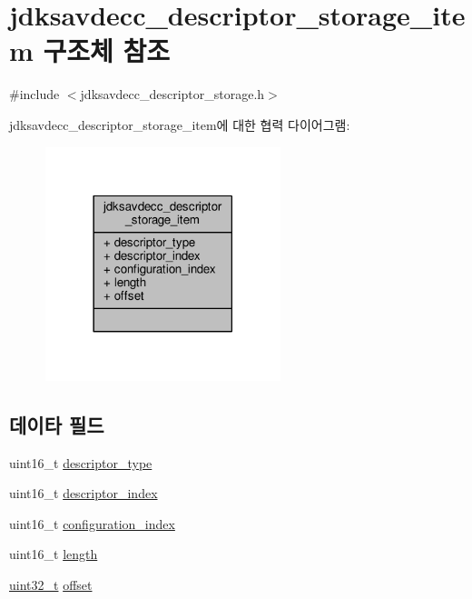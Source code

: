 \hypertarget{structjdksavdecc__descriptor__storage__item}{}\section{jdksavdecc\+\_\+descriptor\+\_\+storage\+\_\+item 구조체 참조}
\label{structjdksavdecc__descriptor__storage__item}


{\ttfamily \#include $<$jdksavdecc\+\_\+descriptor\+\_\+storage.\+h$>$}



jdksavdecc\+\_\+descriptor\+\_\+storage\+\_\+item에 대한 협력 다이어그램\+:
\nopagebreak
\begin{figure}[H]
\begin{center}
\leavevmode
\includegraphics[width=194pt]{structjdksavdecc__descriptor__storage__item__coll__graph}
\end{center}
\end{figure}
\subsection*{데이타 필드}
\begin{DoxyCompactItemize}
\item 
uint16\+\_\+t \hyperlink{structjdksavdecc__descriptor__storage__item_ab7c32b6c7131c13d4ea3b7ee2f09b78d}{descriptor\+\_\+type}
\item 
uint16\+\_\+t \hyperlink{structjdksavdecc__descriptor__storage__item_a042bbc76d835b82d27c1932431ee38d4}{descriptor\+\_\+index}
\item 
uint16\+\_\+t \hyperlink{structjdksavdecc__descriptor__storage__item_afaad1bd7c66f9611e134d8c5ce98f444}{configuration\+\_\+index}
\item 
uint16\+\_\+t \hyperlink{structjdksavdecc__descriptor__storage__item_a1892eba2086d12ac2b09005aeb09ea3b}{length}
\item 
\hyperlink{parse_8c_a6eb1e68cc391dd753bc8ce896dbb8315}{uint32\+\_\+t} \hyperlink{structjdksavdecc__descriptor__storage__item_a894bdfa2d603d8343f8ef01dda6fcd23}{offset}
\end{DoxyCompactItemize}


